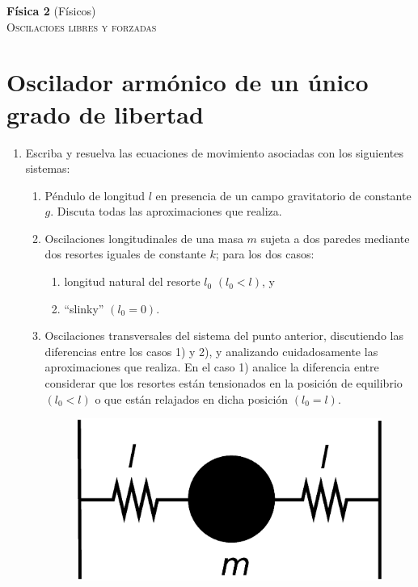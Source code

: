 \documentclass[11pt,spanish,a4paper]{article}
\begin{document}
\begin{center}
\textbf{Física 2} (Físicos) \hfill {}\\
	\textsc{\LARGE Oscilacioes libres y forzadas}
\end{center}


\section*{Oscilador armónico de un único grado de libertad}


\begin{enumerate}


\item Escriba y resuelva las ecuaciones de movimiento asociadas con los
siguientes sistemas: 
\begin{enumerate}
\item Péndulo de longitud $l$ en presencia de un campo gravitatorio de
constante $g$. Discuta todas las aproximaciones que realiza.
\item Oscilaciones longitudinales de una masa $m$ sujeta a dos paredes
mediante dos resortes iguales de constante $k$; para los dos casos: 

\begin{enumerate}
\item longitud natural del resorte $l_{0}$ $(l_{0}<l)$, y 
\item ``slinky'' $(l_{0}=0)$. 
\end{enumerate}
\item Oscilaciones transversales del sistema del punto anterior, discutiendo
las diferencias entre los casos 1) y 2), y analizando cuidadosamente
las aproximaciones que realiza. En el caso 1) analice la diferencia
entre considerar que los resortes están tensionados en la posición
de equilibrio $(l_{0}<l)$ o que están relajados en dicha posición
$(l_{0}=l)$.
\begin{figure}[H]
\centering{}\includegraphics[clip,scale=0.25]{ej1-1}
\end{figure}


\end{enumerate}
\end{enumerate}
\end{document}

